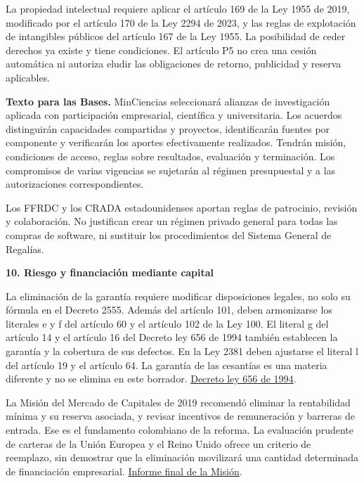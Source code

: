 La propiedad intelectual requiere aplicar el artículo 169 de la Ley 1955 de 2019, modificado por el artículo 170 de la Ley 2294 de 2023, y las reglas de explotación de intangibles públicos del artículo 167 de la Ley 1955. La posibilidad de ceder derechos ya existe y tiene condiciones. El artículo P5 no crea una cesión automática ni autoriza eludir las obligaciones de retorno, publicidad y reserva aplicables.

\textbf{Texto para las Bases.} MinCiencias seleccionará alianzas de investigación aplicada con participación empresarial, científica y universitaria. Los acuerdos distinguirán capacidades compartidas y proyectos, identificarán fuentes por componente y verificarán los aportes efectivamente realizados. Tendrán misión, condiciones de acceso, reglas sobre resultados, evaluación y terminación. Los compromisos de varias vigencias se sujetarán al régimen presupuestal y a las autorizaciones correspondientes.

Los FFRDC y los CRADA estadounidenses aportan reglas de patrocinio, revisión y colaboración. No justifican crear un régimen privado general para todas las compras de software, ni sustituir los procedimientos del Sistema General de Regalías.

\textbf{10. Riesgo y financiación mediante capital}\par\nobreak

La eliminación de la garantía requiere modificar disposiciones legales, no solo su fórmula en el Decreto 2555. Además del artículo 101, deben armonizarse los literales e y f del artículo 60 y el artículo 102 de la Ley 100. El literal g del artículo 14 y el artículo 16 del Decreto ley 656 de 1994 también establecen la garantía y la cobertura de sus defectos. En la Ley 2381 deben ajustarse el literal l del artículo 19 y el artículo 64. La garantía de las cesantías es una materia diferente y no se elimina en este borrador. \href{https://normativa.colpensiones.gov.co/compilacion/docs/decreto\_0656\_1994.htm}{Decreto ley 656 de 1994}.

La Misión del Mercado de Capitales de 2019 recomendó eliminar la rentabilidad mínima y su reserva asociada, y revisar incentivos de remuneración y barreras de entrada. Ese es el fundamento colombiano de la reforma. La evaluación prudente de carteras de la Unión Europea y el Reino Unido ofrece un criterio de reemplazo, sin demostrar que la eliminación movilizará una cantidad determinada de financiación empresarial. \href{https://www.urf.gov.co/documents/d/guest/informe-final-mmc?download=true}{Informe final de la Misión}.


